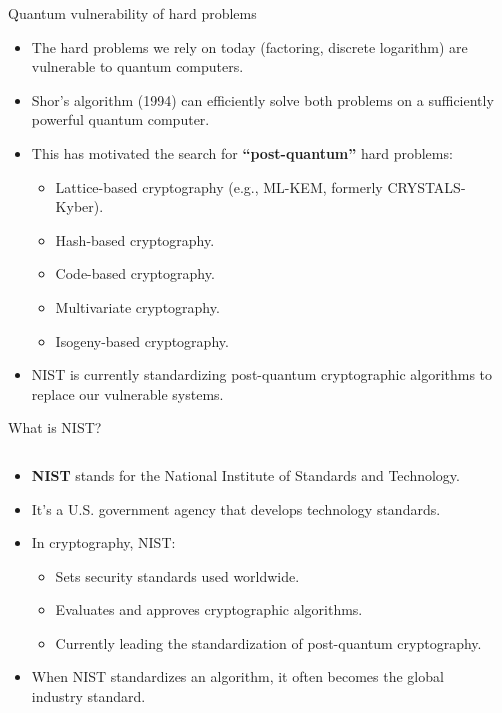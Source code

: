 \documentclass[aspectratio=169, lualatex, handout]{beamer}
\begin{document}
\begin{frame}{Quantum vulnerability of hard problems}
	\begin{itemize}[<+->]
		\item The hard problems we rely on today (factoring, discrete logarithm) are vulnerable to quantum computers.
		\item Shor's algorithm (1994) can efficiently solve both problems on a sufficiently powerful quantum computer.
		\item This has motivated the search for \textbf{``post-quantum''} hard problems:
		      \begin{itemize}[<+->]
			      \item Lattice-based cryptography (e.g., ML-KEM, formerly CRYSTALS-Kyber).
			      \item Hash-based cryptography.
			      \item Code-based cryptography.
			      \item Multivariate cryptography.
			      \item Isogeny-based cryptography.
		      \end{itemize}
		\item NIST is currently standardizing post-quantum cryptographic algorithms to replace our vulnerable systems.
	\end{itemize}
\end{frame}

\begin{frame}{What is NIST?}
	\begin{columns}[c]
		\begin{column}{0.6\textwidth}
			\begin{itemize}[<+->]
				\item \textbf{NIST} stands for the National Institute of Standards and Technology.
				\item It's a U.S. government agency that develops technology standards.
				\item In cryptography, NIST:
				      \begin{itemize}
					      \item Sets security standards used worldwide.
					      \item Evaluates and approves cryptographic algorithms.
					      \item Currently leading the standardization of post-quantum cryptography.
				      \end{itemize}
				\item When NIST standardizes an algorithm, it often becomes the global industry standard.
			\end{itemize}
		\end{column}
		\begin{column}{0.4\textwidth}
		\end{column}
	\end{columns}
\end{frame}
\end{document}

